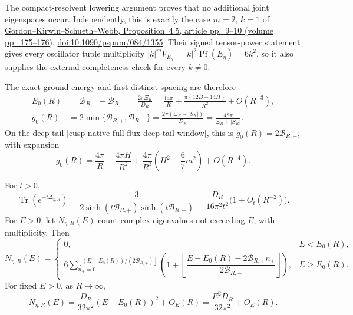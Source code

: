 The compact-resolvent lowering argument proves that no additional joint
eigenspaces occur.  Independently, this is exactly the case \(m=2\), \(k=1\)
of
\href{https://www.math.hu-berlin.de/~schueth/quantumtori.pdf}%
{Gordon--Kirwin--Schueth--Webb, Proposition~4.5, article pp.~9--10
(volume pp.~175--176)},
\href{https://doi.org/10.1090/pspum/084/1355}%
{doi:10.1090/pspum/084/1355}.  Their signed tensor-power statement gives
every oscillator tuple multiplicity
\(|k|^mV_{E_\eta}=|k|^2\operatorname{Pf}(E_\eta)=6k^2\), so it also supplies
the external completeness check for every \(k\ne0\).

The exact ground energy and first distinct spacing are therefore
\begin{align}
 E_0(R)&=\mathcal B_{R,+}+\mathcal B_{R,-}
 =\frac{2\pi\Xi_R}{D_R}
 =\frac{14\pi}{R}+\frac{\pi(12B-14H)}{R^2}+O(R^{-3}),
 \label{cusp-native-full-flux-ground-energy}\\
 g_0(R)&=2\min\{\mathcal B_{R,+},\mathcal B_{R,-}\}
 =\frac{2\pi(\Xi_R-|S_R|)}{D_R}
 =\frac{48\pi}{\Xi_R+|S_R|}.
 \label{cusp-native-full-flux-global-gap}
\end{align}
On the deep tail \cref{cusp-native-full-flux-deep-tail-window}, this is
\(g_0(R)=2\mathcal B_{R,-}\), with expansion
\begin{equation}
 g_0(R)=\frac{4\pi}{R}-\frac{4\pi H}{R^2}
 +\frac{4\pi}{R^3}\left(H^2-\frac67m^2\right)+O(R^{-4}).
 \label{cusp-native-full-flux-gap-expansion}
\end{equation}

\begin{corollary}
\label{cusp-native-full-flux-heat-count}
For \(t>0\),
\begin{equation}
 \operatorname{Tr}(e^{-t\Delta_{\eta,R}})
 =\frac{3}{2\sinh(t\mathcal B_{R,+})
                 \sinh(t\mathcal B_{R,-})}
 =\frac{D_R}{16\pi^2t^2}\bigl(1+O_t(R^{-2})\bigr).
 \label{cusp-native-full-flux-heat-trace}
\end{equation}
For \(E>0\), let \(N_{\eta,R}(E)\) count complex eigenvalues not exceeding
\(E\), with multiplicity.  Then
\begin{equation}
 N_{\eta,R}(E)=
 \begin{cases}
 0,&E<E_0(R),\\[1mm]
 6\displaystyle\sum_{n_+=0}^{\left\lfloor
 (E-E_0(R))/(2\mathcal B_{R,+})\right\rfloor}
 \left(1+\left\lfloor
 \dfrac{E-E_0(R)-2\mathcal B_{R,+}n_+}
       {2\mathcal B_{R,-}}
 \right\rfloor\right),&E\ge E_0(R).
 \end{cases}
 \label{cusp-native-full-flux-counting-function}
\end{equation}
For fixed \(E>0\), as \(R\to\infty\),
\begin{equation}
 N_{\eta,R}(E)
 =\frac{D_R}{32\pi^2}(E-E_0(R))^2+O_E(R)
 =\frac{E^2D_R}{32\pi^2}+O_E(R).
 \label{cusp-native-full-flux-counting-asymptotic}
\end{equation}
\end{corollary}

